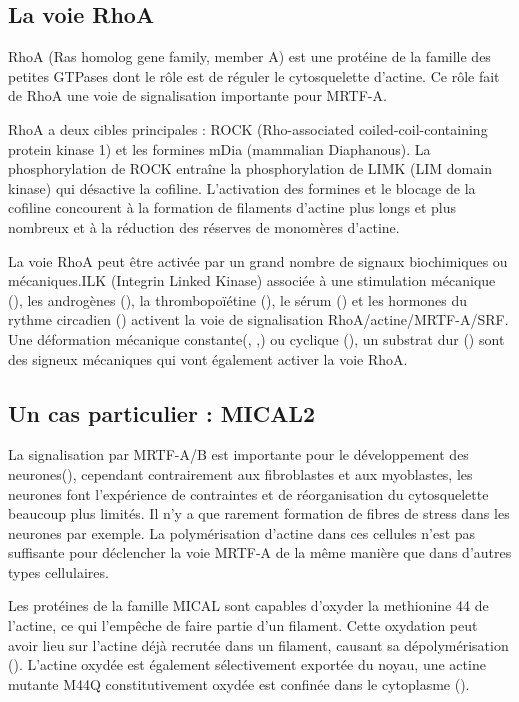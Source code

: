 \documentclass{report}
\begin{document}
\subsection{La voie RhoA}

RhoA (Ras homolog gene family, member A) est une protéine de la famille des petites GTPases dont le rôle est de réguler le cytosquelette d'actine. Ce rôle fait de RhoA une voie de signalisation importante pour MRTF-A. 

RhoA a deux cibles principales : ROCK (Rho-associated coiled-coil-containing protein kinase 1) et les formines mDia (mammalian Diaphanous). La phosphorylation de ROCK entraîne la phosphorylation de LIMK (LIM domain kinase) qui désactive la cofiline. L'activation des formines et le blocage de la cofiline concourent à la formation de filaments d'actine plus longs et plus nombreux et à la réduction des réserves de monomères d'actine. 

La voie RhoA peut être activée par un grand nombre de signaux biochimiques ou mécaniques.ILK (Integrin Linked Kinase) associée à une stimulation mécanique (\cite{maier_tenascin-c_2008}), les androgènes (\cite{schmidt_rhoa_2012}), la thrombopoïétine (\cite{smith_induction_2013}), le sérum (\cite{sotiropoulos_signal-regulated_1999}) et les hormones du rythme circadien (\cite{gerber_blood-borne_2013}) activent la voie de signalisation RhoA/actine/MRTF-A/SRF. 
Une déformation mécanique constante(\cite{albinsson_stretch_2004}, \cite{zhao_force_2007},\cite{chan_force-induced_2010}) ou cyclique (\cite{kuwahara_myocardin-related_2010}), un substrat dur (\cite{huang_matrix_2012}) sont des signeux mécaniques qui vont également activer la voie RhoA. 


\subsection{Un cas particulier : MICAL2}

La signalisation par MRTF-A/B est importante pour le développement des neurones(\cite{kalita_mkls:_2012}), cependant contrairement aux fibroblastes et aux myoblastes, les neurones font l'expérience de contraintes et de réorganisation du cytosquelette beaucoup plus limités. Il n'y a que rarement formation de fibres de stress dans les neurones par exemple. La polymérisation d'actine dans ces cellules n'est pas suffisante pour déclencher la voie MRTF-A de la même manière que dans d'autres types cellulaires. 

Les protéines de la famille MICAL sont capables d'oxyder la methionine 44 de l'actine, ce qui l'empêche de faire partie d'un filament. Cette oxydation peut avoir lieu sur l'actine déjà recrutée dans un filament, causant sa dépolymérisation (\cite{hung_direct_2011}). L'actine oxydée est également sélectivement exportée du noyau, une actine mutante M44Q constitutivement oxydée est confinée dans le cytoplasme (\cite{lundquist_redox_2014}).
\end{document}
